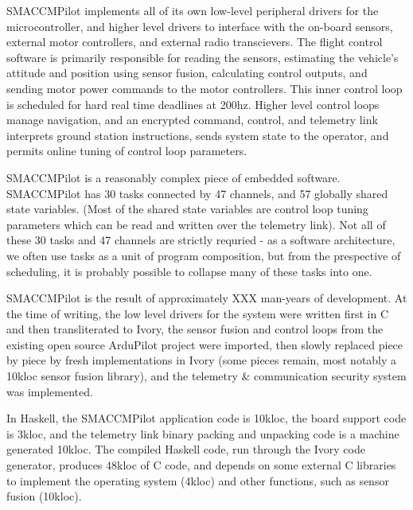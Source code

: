 SMACCMPilot implements all of its own low-level peripheral drivers for the
microcontroller, and higher level drivers to interface with the on-board
sensors, external motor controllers, and external radio transcievers. The flight
control software is primarily responsible for reading the sensors, estimating
the vehicle's attitude and position using sensor fusion, calculating control
outputs, and sending motor power commands to the motor controllers. This inner
control loop is scheduled for hard real time deadlines at 200hz. Higher level
control loops manage navigation, and an encrypted command, control, and
telemetry link interprets ground station instructions, sends system state to
the operator, and permits online tuning of control loop parameters.

SMACCMPilot is a reasonably complex piece of embedded software.  SMACCMPilot has
30 tasks connected by 47 channels, and 57 globally shared state variables. (Most
of the shared state variables are control loop tuning parameters which can be
read and written over the telemetry link). Not all of these 30 tasks and 47
channels are strictly requried - as a software architecture, we often use tasks
as a unit of program composition, but from the prespective of scheduling, it is
probably possible to collapse many of these tasks into one.

SMACCMPilot is the result of approximately XXX man-years of development. At the
time of writing, the low level drivers for the system were written first in C
and then transliterated to Ivory, the sensor fusion and control loops from the
existing open source ArduPilot project were imported, then slowly replaced piece
by piece by fresh implementations in Ivory (some pieces remain, most notably a
10kloc sensor fusion library), and the telemetry \& communication security
system was implemented.

In Haskell, the SMACCMPilot application code is 10kloc, the board support code
is 3kloc, and the telemetry link binary packing and unpacking code is a machine
generated 10kloc. The compiled Haskell code, run through the Ivory code
generator, produces 48kloc of C code, and depends on some external C libraries
to implement the operating system (4kloc) and other functions, such as sensor
fusion (10kloc).


